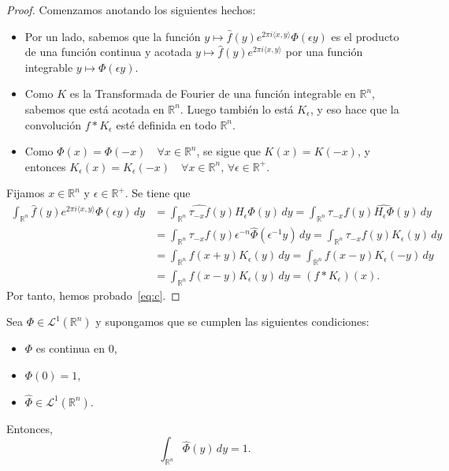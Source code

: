 \begin{proof}
   \noindent Comenzamos anotando los siguientes hechos: 
   \begin{itemize}
       \item Por un lado, sabemos que la función $y \mapsto \widehat{f}(y)e^{2\pi i \langle x, y \rangle} \Phi(\epsilon y)$ es el producto de una función continua y acotada $y \mapsto \widehat{f}(y)e^{2\pi i \langle x, y \rangle}$ por una función integrable   $y  \mapsto \Phi(\epsilon y)$.
       \item Como $K$ es la Transformada de Fourier de una función integrable en $\mathbb{R}^n$, sabemos que está acotada en $\mathbb{R}^n$. Luego también lo está $K_{\epsilon}$, y eso hace que la convolución $f*K_{\epsilon}$ esté definida en todo $\mathbb{R}^n$.
       \item Como $\Phi(x) = \Phi(-x) \quad \forall x \in \mathbb{R}^n$, se sigue que $K(x) = K(-x)$, y entonces $K_{\epsilon}(x) = K_{\epsilon}(-x) \quad \forall x \in \mathbb{R}^n, \, \forall \epsilon \in \mathbb{R}^+.$
   \end{itemize}
   \item Fijamos $x \in \mathbb{R}^n$ y $\epsilon \in \mathbb{R}^+$. Se tiene que
  \begin{equation*}
    \begin{aligned}
      \int_{\mathbb{R}^n} \widehat{f}(y)e^{2 \pi i \langle x,y \rangle}\Phi(\epsilon y) \, dy
        &= \int_{\mathbb{R}^n} \widehat{\tau_{-x}f}(y)H_{\epsilon}\Phi(y) \, dy 
        = \int_{\mathbb{R}^n} \tau_{-x}f(y) \widehat{H_{\epsilon}\Phi}(y) \, dy \\
        &= \int_{\mathbb{R}^n} \tau_{-x}f(y)\epsilon^{-n}\widehat{\Phi}(\epsilon^{-1}y) \, dy 
        = \int_{\mathbb{R}^n} \tau_{-x}f(y)K_{\epsilon}(y) \, dy \\
        &= \int_{\mathbb{R}^n} f(x+y)K_{\epsilon}(y) \, dy 
        = \int_{\mathbb{R}^n} f(x-y)K_{\epsilon}(-y) \, dy \\
        &= \int_{\mathbb{R}^n} f(x-y)K_{\epsilon}(y) \, dy 
        = (f * K_{\epsilon})(x).
    \end{aligned}
\end{equation*}
Por tanto, hemos probado~\eqref{eq:c}.
\end{proof}


\begin{lema}\label{lema}
Sea $\Phi \in \mathscr{L}^1{(\mathbb{R}^n)}$ y supongamos que se cumplen las siguientes condiciones:
\begin{itemize}
    \item $\Phi$ es continua en $0$, 
    \item $\Phi(0) = 1$,
    \item $\widehat{\Phi} \in \mathscr{L}^1(\mathbb{R}^n).$
\end{itemize}
Entonces, 
\begin{equation}
    \int_{\mathbb{R}^n} \widehat{\Phi}(y) \, dy = 1.
\end{equation}
\end{lema}

